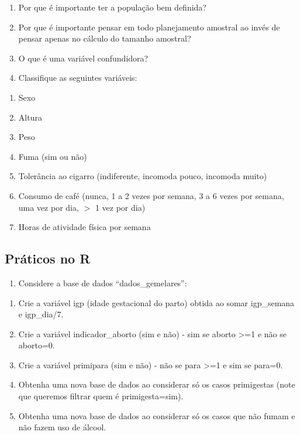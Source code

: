 \documentclass[
]{book}
\providecommand{\tightlist}{%
  \setlength{\itemsep}{0pt}\setlength{\parskip}{0pt}}
\begin{document}
\begin{enumerate}
\def\labelenumi{\arabic{enumi}.}
\item
  Por que é importante ter a população bem definida?
\item
  Por que é importante pensar em todo planejamento amostral ao
  invés de pensar apenas no cálculo do tamanho amostral?
\item
  O que é uma variável confundidora?
\item
  Classifique as seguintes variáveis:
\end{enumerate}

\begin{enumerate}
\def\labelenumi{\alph{enumi}.}
\item
  Sexo
\item
  Altura
\item
  Peso
\item
  Fuma (sim ou não)
\item
  Tolerância ao cigarro (indiferente, incomoda pouco, incomoda muito)
\item
  Consumo de café (nunca, 1 a 2 vezes por semana, 3 a 6 vezes por semana, uma vez por dia, \(>\) 1 vez por dia)
\item
  Horas de atividade física por semana
\end{enumerate}

\hypertarget{pruxe1ticos-no-r}{%
\subsection{Práticos no R}\label{pruxe1ticos-no-r}}

\begin{enumerate}
\def\labelenumi{\arabic{enumi}.}
\setcounter{enumi}{4}
\tightlist
\item
  Considere a base de dados ``dados\_gemelares'':
\end{enumerate}

\begin{enumerate}
\def\labelenumi{\alph{enumi}.}
\item
  Crie a variável igp (idade gestacional do parto)
  obtida ao somar igp\_semana e igp\_dia/7.
\item
  Crie a variável indicador\_aborto (sim e não) - sim se aborto \textgreater=1 e não se aborto=0.
\item
  Crie a variável primipara (sim e não) - não se para \textgreater=1 e sim se para=0.
\item
  Obtenha uma nova base de dados ao considerar só os casos primigestas (note que queremos filtrar quem é primigesta=sim).
\item
  Obtenha uma nova base de dados ao considerar só os casos que não fumam e não fazem uso de álcool.
\end{enumerate}
\end{document}
